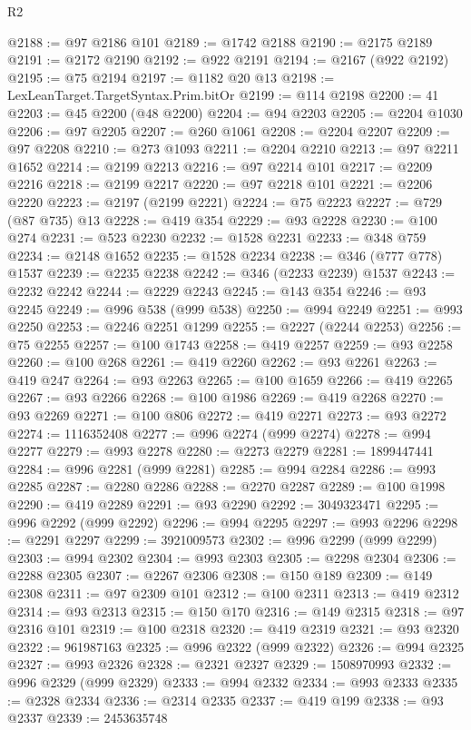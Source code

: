\begin{lexlean}{R2}
\begin{coremodule}
@2188 := @97 @2186 @101
@2189 := @1742 @2188
@2190 := @2175 @2189
@2191 := @2172 @2190
@2192 := @922 @2191
@2194 := @2167 (@922 @2192)
@2195 := @75 @2194
@2197 := @1182 @20 @13
@2198 := LexLeanTarget.TargetSyntax.Prim.bitOr
@2199 := @114 @2198
@2200 := 41
@2203 := @45 @2200 (@48 @2200)
@2204 := @94 @2203
@2205 := @2204 @1030
@2206 := @97 @2205
@2207 := @260 @1061
@2208 := @2204 @2207
@2209 := @97 @2208
@2210 := @273 @1093
@2211 := @2204 @2210
@2213 := @97 @2211 @1652
@2214 := @2199 @2213
@2216 := @97 @2214 @101
@2217 := @2209 @2216
@2218 := @2199 @2217
@2220 := @97 @2218 @101
@2221 := @2206 @2220
@2223 := @2197 (@2199 @2221)
@2224 := @75 @2223
@2227 := @729 (@87 @735) @13
@2228 := @419 @354
@2229 := @93 @2228
@2230 := @100 @274
@2231 := @523 @2230
@2232 := @1528 @2231
@2233 := @348 @759
@2234 := @2148 @1652
@2235 := @1528 @2234
@2238 := @346 (@777 @778) @1537
@2239 := @2235 @2238
@2242 := @346 (@2233 @2239) @1537
@2243 := @2232 @2242
@2244 := @2229 @2243
@2245 := @143 @354
@2246 := @93 @2245
@2249 := @996 @538 (@999 @538)
@2250 := @994 @2249
@2251 := @993 @2250
@2253 := @2246 @2251 @1299
@2255 := @2227 (@2244 @2253)
@2256 := @75 @2255
@2257 := @100 @1743
@2258 := @419 @2257
@2259 := @93 @2258
@2260 := @100 @268
@2261 := @419 @2260
@2262 := @93 @2261
@2263 := @419 @247
@2264 := @93 @2263
@2265 := @100 @1659
@2266 := @419 @2265
@2267 := @93 @2266
@2268 := @100 @1986
@2269 := @419 @2268
@2270 := @93 @2269
@2271 := @100 @806
@2272 := @419 @2271
@2273 := @93 @2272
@2274 := 1116352408
@2277 := @996 @2274 (@999 @2274)
@2278 := @994 @2277
@2279 := @993 @2278
@2280 := @2273 @2279
@2281 := 1899447441
@2284 := @996 @2281 (@999 @2281)
@2285 := @994 @2284
@2286 := @993 @2285
@2287 := @2280 @2286
@2288 := @2270 @2287
@2289 := @100 @1998
@2290 := @419 @2289
@2291 := @93 @2290
@2292 := 3049323471
@2295 := @996 @2292 (@999 @2292)
@2296 := @994 @2295
@2297 := @993 @2296
@2298 := @2291 @2297
@2299 := 3921009573
@2302 := @996 @2299 (@999 @2299)
@2303 := @994 @2302
@2304 := @993 @2303
@2305 := @2298 @2304
@2306 := @2288 @2305
@2307 := @2267 @2306
@2308 := @150 @189
@2309 := @149 @2308
@2311 := @97 @2309 @101
@2312 := @100 @2311
@2313 := @419 @2312
@2314 := @93 @2313
@2315 := @150 @170
@2316 := @149 @2315
@2318 := @97 @2316 @101
@2319 := @100 @2318
@2320 := @419 @2319
@2321 := @93 @2320
@2322 := 961987163
@2325 := @996 @2322 (@999 @2322)
@2326 := @994 @2325
@2327 := @993 @2326
@2328 := @2321 @2327
@2329 := 1508970993
@2332 := @996 @2329 (@999 @2329)
@2333 := @994 @2332
@2334 := @993 @2333
@2335 := @2328 @2334
@2336 := @2314 @2335
@2337 := @419 @199
@2338 := @93 @2337
@2339 := 2453635748

\end{coremodule}
\end{lexlean}
